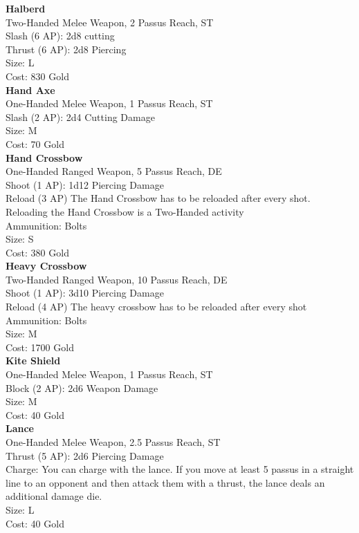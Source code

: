\textbf{Halberd}\\
Two-Handed Melee Weapon, 2 Passus Reach, ST\\
Slash (6 AP): 2d8 cutting\\
Thrust (6 AP): 2d8 Piercing\\
Size: L\\
Cost: 830 Gold\\


\textbf{Hand Axe}\\
One-Handed Melee Weapon, 1 Passus Reach, ST\\
Slash (2 AP): 2d4 Cutting Damage\\
Size: M\\
Cost: 70 Gold\\


\textbf{Hand Crossbow}\\
One-Handed Ranged Weapon, 5 Passus Reach, DE\\
Shoot (1 AP): 1d12 Piercing Damage\\
Reload (3 AP) The Hand Crossbow has to be reloaded after every shot.\\
Reloading the Hand Crossbow is a Two-Handed activity\\
Ammunition: Bolts\\
Size: S\\
Cost: 380 Gold\\


\textbf{Heavy Crossbow}\\
Two-Handed Ranged Weapon, 10 Passus Reach, DE\\
Shoot (1 AP): 3d10 Piercing Damage\\
Reload (4 AP) The heavy crossbow has to be reloaded after every shot\\
Ammunition: Bolts\\
Size: M\\
Cost: 1700 Gold\\


\textbf{Kite Shield}\\
One-Handed Melee Weapon, 1 Passus Reach, ST\\
Block (2 AP): 2d6 Weapon Damage\\
Size: M\\
Cost: 40 Gold\\


\textbf{Lance}\\
One-Handed Melee Weapon, 2.5 Passus Reach, ST\\
Thrust (5 AP): 2d6 Piercing Damage\\
Charge: You can charge with the lance. If you move at least 5 passus in a straight line to an opponent and then attack them with a thrust, the lance deals an additional damage die.\\
Size: L\\
Cost: 40 Gold\\


